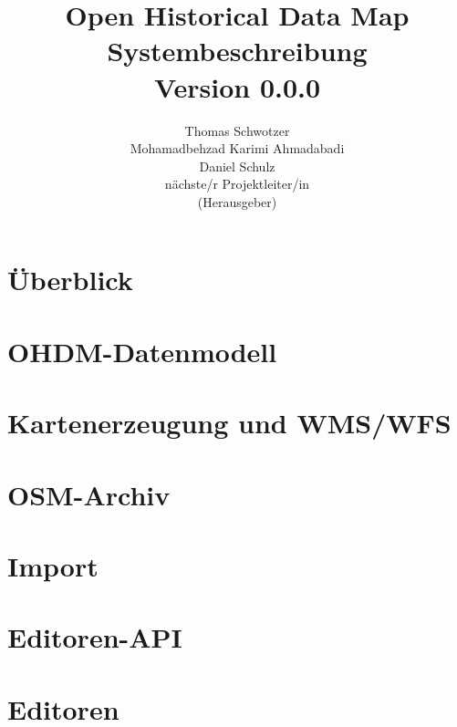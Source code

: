 \documentclass[german]{book}
\begin{document}
\title{Open Historical Data Map\\
Systembeschreibung \\
Version 0.0.0
}

\author{
Thomas Schwotzer \\
Mohamadbehzad Karimi Ahmadabadi\\
Daniel Schulz\\
nächste/r Projektleiter/in\\
(Herausgeber)
}

\maketitle

\tableofcontents

\chapter{Überblick}


\chapter{OHDM-Datenmodell}


\chapter{Kartenerzeugung und WMS/WFS}


\chapter{OSM-Archiv}


\chapter{Import}


\chapter{Editoren-API}


\chapter{Editoren}

\end{document}
